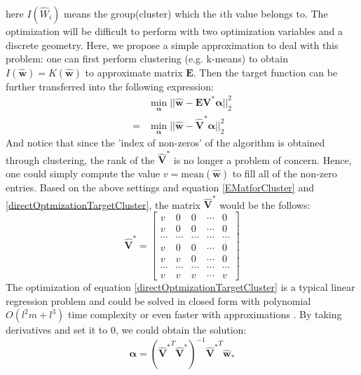 \documentclass[preprint,10pt]{elsarticle}
\begin{document}
here $I(\hat{W}_i)$ means the group(cluster) which the $i$th value belongs to. The optimization will be difficult to perform with two optimization variables and a discrete geometry. Here, we propose a simple approximation to deal with this problem: one can first perform clustering (e.g. k-means) to obtain $I(\boldsymbol{\hat{w}}) = K(\boldsymbol{\hat{w}})$ to approximate matrix $\boldsymbol{E}$. Then the target function can be further transferred into the following expression:\\
\begin{equation}\label{directOptmizationTargetCluster}
\begin{aligned}
&\min_{\boldsymbol{\alpha}} ||\boldsymbol{\hat{w}}-\boldsymbol{E}\boldsymbol{V^{*}}\boldsymbol{\alpha}||_{2}^{2}\\
=&\min_{\boldsymbol{\alpha}} ||\boldsymbol{\hat{w}}-\boldsymbol{\hat{V}^{*}}\boldsymbol{\alpha}||_{2}^{2}
\end{aligned}
\end{equation}
And notice that since the 'index of non-zeros' of the algorithm is obtained through clustering, the rank of the $\boldsymbol{\hat{V}^{*}}$ is no longer a problem of concern. Hence, one could simply compute the value $v=\text{mean}(\boldsymbol{\hat{w}})$ to fill all of the non-zero entries. Based on the above settings and equation \ref{EMatforCluster} and \ref{directOptmizationTargetCluster}, the matrix $\boldsymbol{\hat{V}^{*}}$ would be the follows:\\
$$
\boldsymbol{\hat{V}^{*}} =
\begin{bmatrix}
v & 0 & 0 & \cdots & 0\\
v & 0 & 0 & \cdots & 0\\
\cdots & \cdots & \cdots & \cdots & \cdots \\
v & 0 & 0 & \cdots & 0\\
v & v & 0 & \cdots & 0\\
\cdots & \cdots & \cdots & \cdots & \cdots \\
v & v & v & \cdots & v
\end{bmatrix}
$$
The optimization of equation \ref{directOptmizationTargetCluster} is a typical linear regression problem and could be solved in closed form with polynomial $O(l^{2}m+l^{3})$ time complexity or even faster with approximations \cite{dhillon2013LeastSquareApproximation}. By taking derivatives and set it to 0, we could obtain the solution:\\
\begin{equation}\label{clusteringExactQuantizationSolution}
\boldsymbol{\alpha} = (\boldsymbol{\hat{V}^{*}}^{T}\boldsymbol{\hat{V}^{*}})^{-1}\boldsymbol{\hat{V}^{*}}^{T}\boldsymbol{\hat{w}_{*}}
\end{equation}
\end{document}
